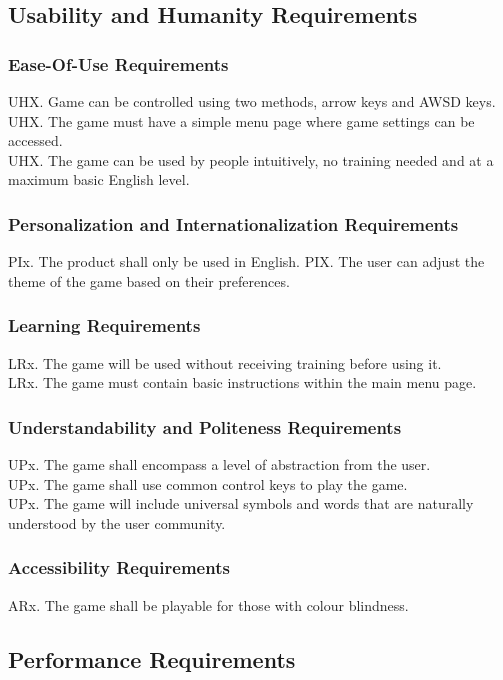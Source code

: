 \documentclass{article}
\begin{document}
\subsection{Usability and Humanity Requirements}
    \subsubsection{Ease-Of-Use Requirements}
    UHX. Game can be controlled using two methods, arrow keys and AWSD keys.\\
    UHX. The game must have a simple menu page where game settings can be accessed.\\
    UHX. The game can be used by people intuitively, no training needed and at a maximum basic English level.
    
    \subsubsection{Personalization and Internationalization Requirements}
    PIx. The product shall only be used in English.
    PIX. The user can adjust the theme of the game based on their preferences.
    
    \subsubsection{Learning Requirements}
    LRx. The game will be used without receiving training before using it.\\
    LRx. The game must contain basic instructions within the main menu page.

    \subsubsection{Understandability and Politeness Requirements}
    UPx. The game shall encompass a level of abstraction from the user.\\
    UPx. The game shall use common control keys to play the game.\\
    UPx. The game will include universal symbols and words that are naturally understood by the user community.
    
    \subsubsection{Accessibility Requirements}
    ARx. The game shall be playable for those with colour blindness.
    
\subsection{Performance Requirements}
\end{document}
